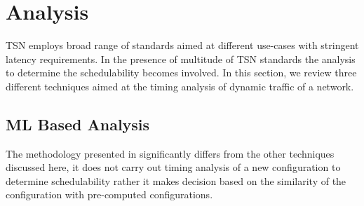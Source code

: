 \documentclass[journal,12pt,twocolumn]{IEEEtran}
\begin{document}
%
%

\section {Analysis}
TSN employs broad range of standards aimed at different use-cases with stringent latency requirements. In the presence of multitude of TSN standards the analysis to determine the schedulability becomes involved. In this section, we review three different techniques aimed at the timing analysis of dynamic traffic of a network.

\subsection {ML Based Analysis}
The methodology presented in \cite{ML} significantly differs from the other techniques discussed here, it does not carry out timing analysis of a new configuration to determine schedulability rather it makes decision based on the similarity of the configuration with pre-computed configurations.
\end{document}
